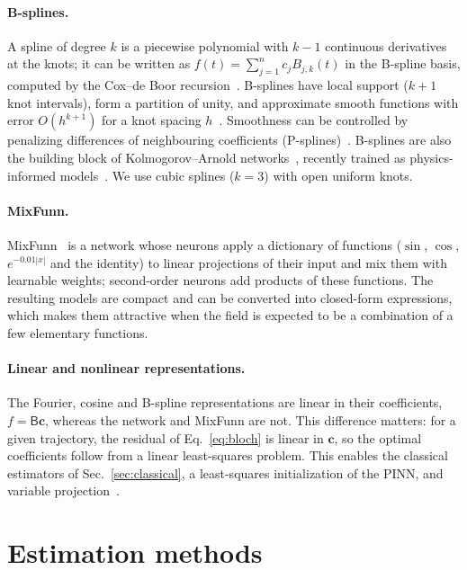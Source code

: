 \documentclass[aps,pra,twocolumn,superscriptaddress,10pt,longbibliography,floatfix]{revtex4-2}
\begin{document}
\paragraph{B-splines.}
A spline of degree $k$ is a piecewise polynomial with $k-1$ continuous derivatives at the knots; it can
be written as $f(t)=\sum_{j=1}^{n}c_jB_{j,k}(t)$ in the B-spline basis, computed by the Cox--de Boor
recursion~\cite{deboor2001splines}. B-splines have local support ($k+1$ knot intervals), form a
partition of unity, and approximate smooth functions with error $O(h^{k+1})$ for a knot spacing
$h$~\cite{deboor2001splines}. Smoothness can be controlled by penalizing differences of neighbouring
coefficients (P-splines)~\cite{eilers1996psplines}. B-splines are also the building block of
Kolmogorov--Arnold networks~\cite{liu2024kan}, recently trained as physics-informed
models~\cite{kiyani2025optimizer}. We use cubic splines ($k=3$) with open uniform knots.

\paragraph{MixFunn.}
MixFunn~\cite{farias2025mixfunn} is a network whose neurons apply a dictionary of functions
($\sin$, $\cos$, $e^{-0.01|x|}$ and the identity) to linear projections of their input and mix them
with learnable weights; second-order neurons add products of these functions. The resulting models
are compact and can be converted into closed-form expressions, which makes them attractive when the
field is expected to be a combination of a few elementary functions.

\paragraph{Linear and nonlinear representations.}
The Fourier, cosine and B-spline representations are linear in their coefficients, $f=\mathsf B\bm c$,
whereas the network and MixFunn are not. This difference matters: for a given trajectory, the residual
of Eq.~\eqref{eq:bloch} is linear in $\bm c$, so the optimal coefficients follow from a linear
least-squares problem. This enables the classical estimators of Sec.~\ref{sec:classical}, a
least-squares initialization of the PINN, and variable projection~\cite{golub1973varpro}.

\section{Estimation methods}\label{sec:methods}
\end{document}
